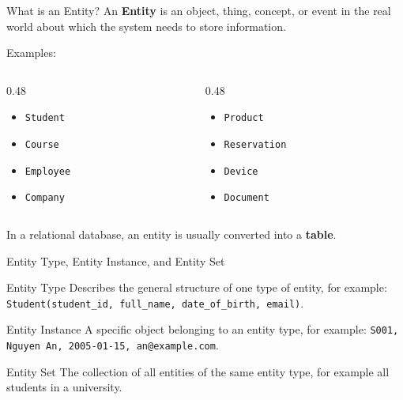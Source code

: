 \documentclass[aspectratio=169,11pt]{beamer}
\newcommand{\keyword}[1]{\textcolor{accent}{\textbf{#1}}}
\newcommand{\kw}[1]{\keyword{#1}}
\newcommand{\smallitem}{\setlength{\itemsep}{2pt}\setlength{\parskip}{0pt}}
\begin{document}
\begin{frame}{What is an Entity?}
\small
An \kw{Entity} is an object, thing, concept, or event in the real world about which the system needs to store information.

\vspace{2mm}
Examples:
\begin{columns}[T]
\begin{column}{0.48\textwidth}
\begin{itemize}
\smallitem
  \item \texttt{Student}
  \item \texttt{Course}
  \item \texttt{Employee}
  \item \texttt{Company}
\end{itemize}
\end{column}
\begin{column}{0.48\textwidth}
\begin{itemize}
\smallitem
  \item \texttt{Product}
  \item \texttt{Reservation}
  \item \texttt{Device}
  \item \texttt{Document}
\end{itemize}
\end{column}
\end{columns}

\vspace{2mm}
In a relational database, an entity is usually converted into a \kw{table}.
\end{frame}

\begin{frame}{Entity Type, Entity Instance, and Entity Set}
\small
\begin{block}{Entity Type}
Describes the general structure of one type of entity, for example: \texttt{Student(student\_id, full\_name, date\_of\_birth, email)}.
\end{block}

\begin{block}{Entity Instance}
A specific object belonging to an entity type, for example: \texttt{S001, Nguyen An, 2005-01-15, an@example.com}.
\end{block}

\begin{block}{Entity Set}
The collection of all entities of the same entity type, for example all students in a university.
\end{block}
\end{frame}
\end{document}
